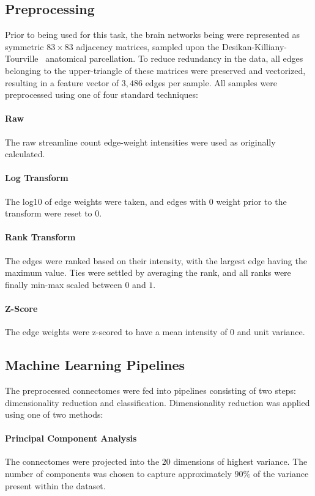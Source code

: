 \documentclass[10pt]{SelfArx} %
\begin{document}
\subsection*{Preprocessing}
Prior to being used for this task, the brain networks being were represented as symmetric $83 \times 83$ adjacency
matrices, sampled upon the Desikan-Killiany-Tourville~\cite{Klein2012-vi} anatomical parcellation. To reduce redundancy
in the data, all edges belonging to the upper-triangle of these matrices were preserved and vectorized, resulting in a
feature vector of $3,486$ edges per sample. All samples were preprocessed using one of four standard techniques:

\paragraph{Raw} The raw streamline count edge-weight intensities were used as originally calculated.

\paragraph{Log Transform} The log10 of edge weights were taken, and edges with $0$ weight prior to the transform were
reset to $0$.

\paragraph{Rank Transform} The edges were ranked based on their intensity, with the largest edge having the maximum
value. Ties were settled by averaging the rank, and all ranks were finally min-max scaled between $0$ and $1$.

\paragraph{Z-Score} The edge weights were z-scored to have a mean intensity of $0$ and unit variance.

\subsection*{Machine Learning Pipelines}

The preprocessed connectomes were fed into pipelines consisting of two steps: dimensionality reduction and
classification. Dimensionality reduction was applied using one of two methods:

\paragraph{Principal Component Analysis} The connectomes were projected into the $20$ dimensions of highest variance.
The number of components was chosen to capture approximately $90\%$ of the variance present within the dataset.
\end{document}
